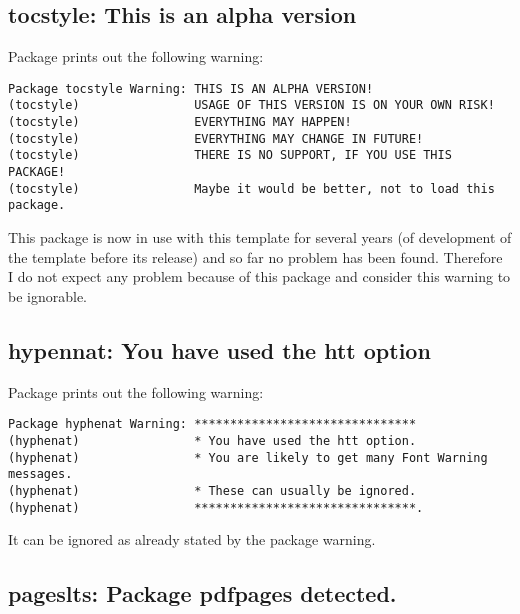 %


\subsection{tocstyle: This is an alpha version}

Package  prints out the following warning:
%
\begin{verbatim}
Package tocstyle Warning: THIS IS AN ALPHA VERSION!
(tocstyle)                USAGE OF THIS VERSION IS ON YOUR OWN RISK!
(tocstyle)                EVERYTHING MAY HAPPEN!
(tocstyle)                EVERYTHING MAY CHANGE IN FUTURE!
(tocstyle)                THERE IS NO SUPPORT, IF YOU USE THIS PACKAGE!
(tocstyle)                Maybe it would be better, not to load this package.
\end{verbatim}
%
This package is now in use with this template for several years (of development of the template before its release) and so far no problem has been found. Therefore I do not expect any problem because of this package and consider this warning to be ignorable.

\subsection{hypennat: You have used the htt option}

Package  prints out the following warning:
%
\begin{verbatim}
Package hyphenat Warning: *******************************
(hyphenat)                * You have used the htt option.
(hyphenat)                * You are likely to get many Font Warning messages.
(hyphenat)                * These can usually be ignored.
(hyphenat)                *******************************.
\end{verbatim}
%
It can be ignored as already stated by the package warning.

\subsection{pageslts: Package pdfpages detected.}

